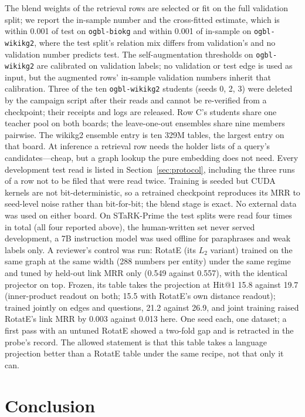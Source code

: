 \documentclass[11pt,a4paper]{article}
\begin{document}
The blend weights of the retrieval rows are selected or fit on the full
validation split; we report the in-sample number and the cross-fitted
estimate, which is within 0.001 of test on \texttt{ogbl-biokg} and within
0.001 of in-sample on \texttt{ogbl-wikikg2}, where the test split's
relation mix differs from validation's and no validation number predicts
test. The self-augmentation thresholds on \texttt{ogbl-wikikg2} are
calibrated on validation labels; no validation or test edge is used as
input, but the augmented rows' in-sample validation numbers inherit that
calibration. Three of the ten \texttt{ogbl-wikikg2} students (seeds 0, 2,
3) were deleted by the campaign script after their reads and cannot be
re-verified from a checkpoint; their receipts and logs are released.
Row C's students share one teacher pool on both boards; the leave-one-out
ensembles share nine members pairwise. The wikikg2 ensemble entry is ten
329M tables, the largest entry on that board. At inference a retrieval
row needs the holder lists of a query's candidates---cheap, but a graph
lookup the pure embedding does not need. Every development test read is
listed in Section~\ref{sec:protocol}, including the three runs of a
row not to be filed that were read twice. Training is seeded but CUDA
kernels are not bit-deterministic, so a retrained checkpoint reproduces
its MRR to seed-level noise rather than bit-for-bit; the blend stage is
exact. No external data was used on either board. On STaRK-Prime the
test splits were read four times in total (all four reported above),
the human-written set never served development, a 7B instruction model was
used offline for paraphrases and weak labels only. A reviewer's control
was run: RotatE (its $L_2$ variant) trained on the same graph at the same
width (288 numbers per entity) under the same regime and tuned by
held-out link MRR only (0.549 against 0.557), with the identical
projector on top. Frozen, its table takes the projection at Hit@1 15.8
against 19.7 (inner-product readout on both; 15.5 with RotatE's own
distance readout); trained jointly on edges and questions, 21.2 against
26.9, and joint training raised RotatE's link MRR by 0.003 against
0.013 here. One seed each, one dataset; a first pass with an untuned
RotatE showed a two-fold gap and is retracted in the probe's record. The
allowed statement is that this table takes a language projection better
than a RotatE table under the same recipe, not that only it can.

\section{Conclusion}
\end{document}

